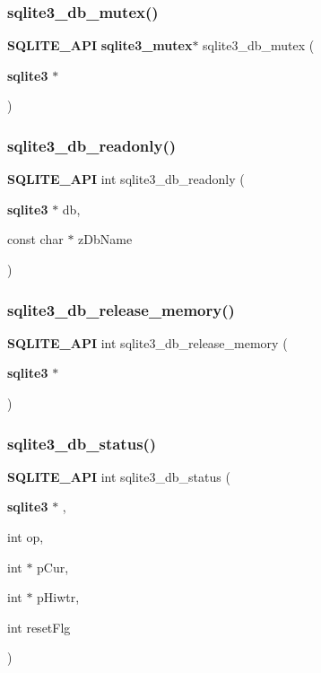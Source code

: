 \subsubsection{sqlite3\_db\_mutex()}
{\footnotesize\ttfamily \textbf{ S\+Q\+L\+I\+T\+E\+\_\+\+A\+PI} \textbf{ sqlite3\+\_\+mutex}$\ast$ sqlite3\+\_\+db\+\_\+mutex (\begin{DoxyParamCaption}\item[{\textbf{ sqlite3} $\ast$}]{ }\end{DoxyParamCaption})}

\mbox{\label{sqlite3_8h_a96c378e7022e7a8a375e23f7fc662cdd}} 
\subsubsection{sqlite3\_db\_readonly()}
{\footnotesize\ttfamily \textbf{ S\+Q\+L\+I\+T\+E\+\_\+\+A\+PI} int sqlite3\+\_\+db\+\_\+readonly (\begin{DoxyParamCaption}\item[{\textbf{ sqlite3} $\ast$}]{db,  }\item[{const char $\ast$}]{z\+Db\+Name }\end{DoxyParamCaption})}

\mbox{\label{sqlite3_8h_af2a4fce512d3398c240178856d1af243}} 
\subsubsection{sqlite3\_db\_release\_memory()}
{\footnotesize\ttfamily \textbf{ S\+Q\+L\+I\+T\+E\+\_\+\+A\+PI} int sqlite3\+\_\+db\+\_\+release\+\_\+memory (\begin{DoxyParamCaption}\item[{\textbf{ sqlite3} $\ast$}]{ }\end{DoxyParamCaption})}

\mbox{\label{sqlite3_8h_ab64e8333313ee2e44116842711818940}} 
\subsubsection{sqlite3\_db\_status()}
{\footnotesize\ttfamily \textbf{ S\+Q\+L\+I\+T\+E\+\_\+\+A\+PI} int sqlite3\+\_\+db\+\_\+status (\begin{DoxyParamCaption}\item[{\textbf{ sqlite3} $\ast$}]{,  }\item[{int}]{op,  }\item[{int $\ast$}]{p\+Cur,  }\item[{int $\ast$}]{p\+Hiwtr,  }\item[{int}]{reset\+Flg }\end{DoxyParamCaption})}

